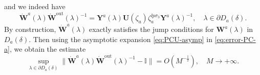 and we indeed have
 \begin{equation}
\dot{\mathbf{W}}^a(\lambda)\dot{\mathbf{W}}^\mathrm{out}(\lambda)^{-1} = \mathbf{Y}^a(\lambda)\mathbf{U}(\zeta_a) \zeta_a^{\ii p \sigma_3} \mathbf{Y}^a(\lambda)^{-1},\quad \lambda\in\partial D_a(\delta).
\label{eq:error-PC-a}
\end{equation}
By construction, $\dot{\mathbf{W}}^a(\lambda)$ exactly satisfies the jump conditions for $\mathbf{W}^a(\lambda)$ in $D_a(\delta)$.
Then
using the asymptotic expansion \eqref{eq:PCU-asymp} in \eqref{eq:error-PC-a}, we obtain the estimate
\begin{equation}
\sup_{\lambda \in \partial D_a(\delta)}\| \dot{\mathbf{W}}^a(\lambda) \dot{\mathbf{W}}^{\mathrm{out}}(\lambda)^{-1} -\mathbb{I} \| = O(M^{-\frac{1}{2}}),\quad M\to+\infty.
\label{eq:error-PC-disk-a-large-M}
\end{equation}







